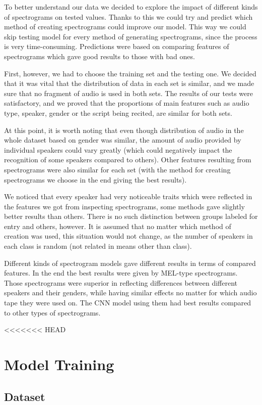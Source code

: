 \documentclass[11pt, letterpaper]{article}
\begin{document}
To better understand our data we decided to explore the impact of different kinds of spectrograms on tested values. Thanks to this we could try and predict which method of creating spectrograms could improve our model. This way we could skip testing model for every method of generating spectrograms, since the process is very time-consuming. Predictions were based on comparing features of spectrograms which gave good results to those with bad ones. 

First, however, we had to choose the training set and the testing one. We decided that it was vital that the distribution of data in each set is similar, and we made sure that no fragment of audio is used in both sets.  The results of our tests were satisfactory, and we proved that the proportions of main features such as audio type, speaker, gender or the script being recited, are similar for both sets.

At this point, it is worth noting that even though distribution of audio in the whole dataset based on gender was similar, the amount of audio provided by individual speakers could vary greatly (which could negatively impact the recognition of some speakers compared to others). Other features resulting from spectrograms were also similar for each set (with the method for creating spectrograms we choose in the end giving the best results). 

We noticed that every speaker had very noticeable traits which were reflected in the features we got from inspecting spectrograms, some methods gave slightly better results than others. There is no such distinction between groups labeled for entry and others, however. It is assumed that no matter which method of creation was used, this situation would not change, as the number of speakers in each class is random (not related in means other than class).

Different kinds of spectrogram models gave different results in terms of compared features. In the end the best results were given by MEL-type spectrograms. Those spectrograms were superior in reflecting differences between different speakers and their genders, while having similar effects no matter for which audio tape they were used on. The CNN model using them had best results compared to other types of spectrograms.

<<<<<<< HEAD
\section{Model Training}
\subsection{Dataset}
\end{document}
